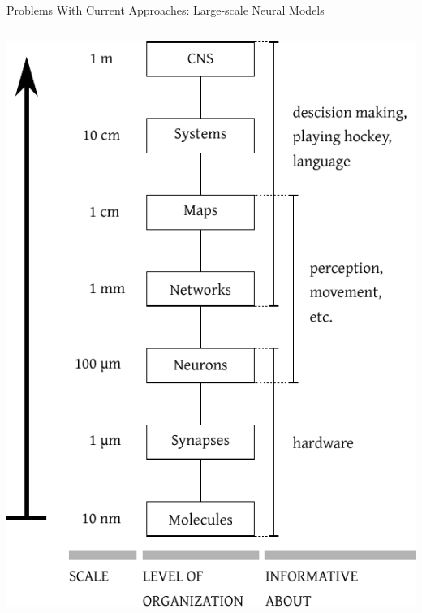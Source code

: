 \documentclass[handout,aspectratio=169]{beamer}
\begin{document}
\begin{frame}{Problems With Current Approaches: Large-scale Neural Models}
\begin{columns}[c]
		\includegraphics[width=\textwidth]{media/levels_direction_bottom_up.pdf}
	\end{columns}
\end{frame}
\end{document}
